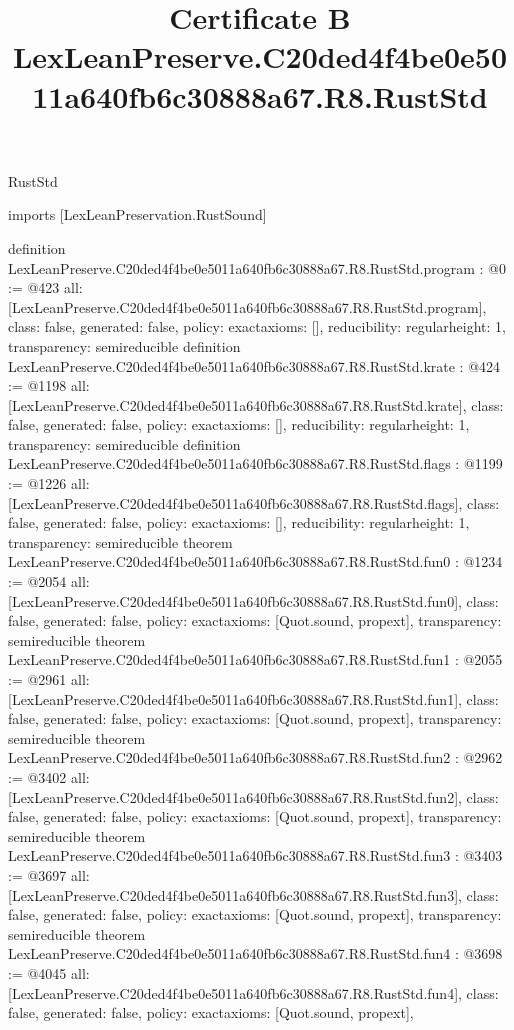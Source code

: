 \begin{lexlean}{RustStd}
\title{Certificate B LexLeanPreserve.C20ded4f4be0e5011a640fb6c30888a67.R8.RustStd}
\begin{coremodule}
imports [LexLeanPreservation.RustSound]

definition LexLeanPreserve.C20ded4f4be0e5011a640fb6c30888a67.R8.RustStd.program : @0 := @423 {
  all: [LexLeanPreserve.C20ded4f4be0e5011a640fb6c30888a67.R8.RustStd.program],
  class: false,
  generated: false,
  policy: exact{axioms: []},
  reducibility: regular{height: 1},
  transparency: semireducible
}
definition LexLeanPreserve.C20ded4f4be0e5011a640fb6c30888a67.R8.RustStd.krate : @424 := @1198 {
  all: [LexLeanPreserve.C20ded4f4be0e5011a640fb6c30888a67.R8.RustStd.krate],
  class: false,
  generated: false,
  policy: exact{axioms: []},
  reducibility: regular{height: 1},
  transparency: semireducible
}
definition LexLeanPreserve.C20ded4f4be0e5011a640fb6c30888a67.R8.RustStd.flags : @1199 := @1226 {
  all: [LexLeanPreserve.C20ded4f4be0e5011a640fb6c30888a67.R8.RustStd.flags],
  class: false,
  generated: false,
  policy: exact{axioms: []},
  reducibility: regular{height: 1},
  transparency: semireducible
}
theorem LexLeanPreserve.C20ded4f4be0e5011a640fb6c30888a67.R8.RustStd.fun0 : @1234 := @2054 {
  all: [LexLeanPreserve.C20ded4f4be0e5011a640fb6c30888a67.R8.RustStd.fun0],
  class: false,
  generated: false,
  policy: exact{axioms: [Quot.sound, propext]},
  transparency: semireducible
}
theorem LexLeanPreserve.C20ded4f4be0e5011a640fb6c30888a67.R8.RustStd.fun1 : @2055 := @2961 {
  all: [LexLeanPreserve.C20ded4f4be0e5011a640fb6c30888a67.R8.RustStd.fun1],
  class: false,
  generated: false,
  policy: exact{axioms: [Quot.sound, propext]},
  transparency: semireducible
}
theorem LexLeanPreserve.C20ded4f4be0e5011a640fb6c30888a67.R8.RustStd.fun2 : @2962 := @3402 {
  all: [LexLeanPreserve.C20ded4f4be0e5011a640fb6c30888a67.R8.RustStd.fun2],
  class: false,
  generated: false,
  policy: exact{axioms: [Quot.sound, propext]},
  transparency: semireducible
}
theorem LexLeanPreserve.C20ded4f4be0e5011a640fb6c30888a67.R8.RustStd.fun3 : @3403 := @3697 {
  all: [LexLeanPreserve.C20ded4f4be0e5011a640fb6c30888a67.R8.RustStd.fun3],
  class: false,
  generated: false,
  policy: exact{axioms: [Quot.sound, propext]},
  transparency: semireducible
}
theorem LexLeanPreserve.C20ded4f4be0e5011a640fb6c30888a67.R8.RustStd.fun4 : @3698 := @4045 {
  all: [LexLeanPreserve.C20ded4f4be0e5011a640fb6c30888a67.R8.RustStd.fun4],
  class: false,
  generated: false,
  policy: exact{axioms: [Quot.sound, propext]},
}
\end{coremodule}
\end{lexlean}
